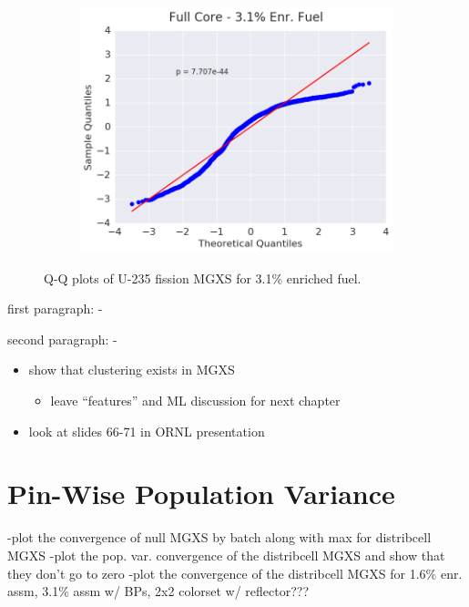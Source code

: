 \begin{figure}[h!]
\begin{subfigure}{0.5\textwidth}
  \includegraphics[width=\linewidth]{figures/patterns/full-core/quantile/31-enr-fiss-2} \caption{}
  \label{fig:chap9-qq-full-core-3.1-fiss}
\end{subfigure}
\caption[Q-Q plots of U-235 fission MGXS 3.1\% enriched fuel]{Q-Q plots of U-235 fission \ac{MGXS} for 3.1\% enriched fuel.}
\label{fig:chap9-qq-3.1-fiss}
\end{figure}




first paragraph:
-

second paragraph:
-

\begin{itemize}[noitemsep]
  \item show that clustering exists in MGXS
  \begin{itemize}[noitemsep]
    \item leave ``features'' and ML discussion for next chapter
  \end{itemize}
  \item look at slides 66-71 in ORNL presentation
\end{itemize}


\section{Pin-Wise Population Variance}

-plot the convergence of null MGXS by batch along with max for distribcell MGXS
-plot the pop. var. convergence of the distribcell MGXS and show that they don't go to zero
-plot the convergence of the distribcell MGXS for 1.6\% enr. assm, 3.1\% assm w/ BPs, 2x2 colorset w/ reflector???

